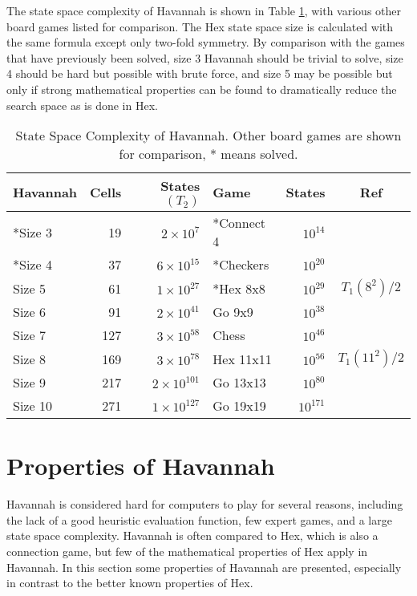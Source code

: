 The state space complexity of Havannah is shown in Table \ref{table:complexity}, with various other board games listed for comparison. The Hex state space size is calculated with the same formula except only two-fold symmetry. By comparison with the games that have previously been solved, size 3 Havannah should be trivial to solve, size 4 should be hard but possible with brute force, and size 5 may be possible but only if strong mathematical properties can be found to dramatically reduce the search space as is done in Hex.

\begin{table}
	\centering
	\begin{tabular}{lrr|lrc}
	Havannah  & Cells & States $(T_2)$      & Game       & States     & Ref \\ \hline
	*Size 3   &    19 & $2 \times 10^{7}$   & *Connect 4 & $10^{14}$  & \cite{trompconnect4} \\
	*Size 4   &    37 & $6 \times 10^{15}$  & *Checkers  & $10^{20}$  & \cite{schaeffer1998solving}\\
	Size 5    &    61 & $1 \times 10^{27}$  & *Hex 8x8   & $10^{29}$  & \cite{henderson2009solving} $T_1(8^2)/2$\\
	Size 6    &    91 & $2 \times 10^{41}$  & Go 9x9     & $10^{38}$  & \cite{tromp2007combinatorics}\\
	Size 7    &   127 & $3 \times 10^{58}$  & Chess      & $10^{46}$  & \cite{tromp2010chess}\\
	Size 8    &   169 & $3 \times 10^{78}$  & Hex 11x11  & $10^{56}$  & $T_1(11^2)/2$\\
	Size 9    &   217 & $2 \times 10^{101}$ & Go 13x13   & $10^{80}$  & \cite{tromp2007combinatorics}\\
	Size 10   &   271 & $1 \times 10^{127}$ & Go 19x19   & $10^{171}$ & \cite{tromp2007combinatorics}\\
	\end{tabular}
	\caption[State Space Complexity of Havannah]{State Space Complexity of Havannah. Other board games are shown for comparison, * means solved.}
	\label{table:complexity}
\end{table}

\section{Properties of Havannah}\label{sec:properties}

Havannah is considered hard for computers to play for several reasons, including the lack of a good heuristic evaluation function, few expert games, and a large state space complexity. Havannah is often compared to Hex, which is also a connection game, but few of the mathematical properties of Hex apply in Havannah. In this section some properties of Havannah are presented, especially in contrast to the better known properties of Hex.



